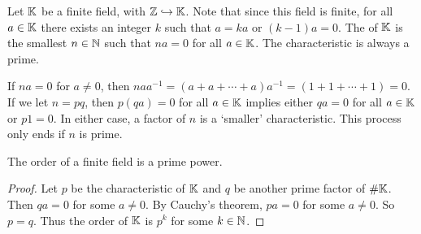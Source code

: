 Let $\mathbb{K}$ be a finite field, with $\mathbb{Z} \hookrightarrow \mathbb{K}$. Note that since this field is finite, for all $a \in \mathbb{K}$ there exists an integer $k$ such that $a = ka$ or $(k-1)a = 0$. The  of $\mathbb{K}$ is the smallest $n \in \mathbb{N}$ such that $na = 0$ for all $a \in \mathbb{K}$. The characteristic is always a prime.

If $na = 0$ for $a \neq 0$, then $na a^{-1} = (a + a + \cdots + a) a^{-1} = (1 + 1 + \cdots + 1) = 0$. If we let $n = pq$, then $p(qa) = 0$ for all $a \in \mathbb{K}$ implies either $qa = 0$ for all $a \in \mathbb{K}$ or $p 1 = 0$. In either case, a factor of $n$ is a `smaller' characteristic. This process only ends if $n$ is prime.

\begin{proposition}
    The order of a finite field is a prime power.
\end{proposition}
\begin{proof}
    Let $p$ be the characteristic of $\mathbb{K}$ and $q$ be another prime factor of $\# \mathbb{K}$. Then $qa = 0$ for some $a \neq 0$. By Cauchy's theorem, $pa = 0$ for some $a \neq 0$. So $p = q$. Thus the order of $\mathbb{K}$ is $p^{k}$ for some $k \in \mathbb{N}$.
\end{proof}